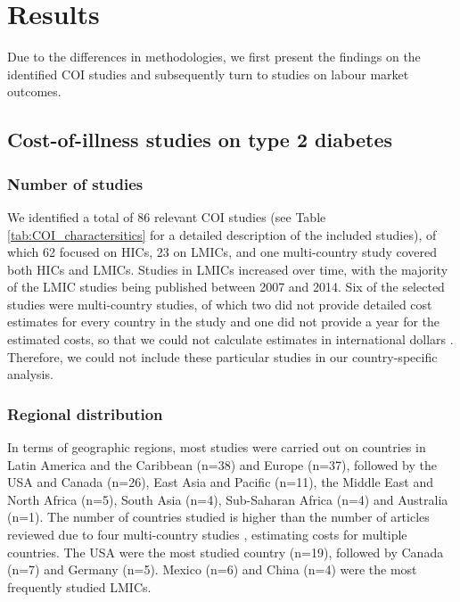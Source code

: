 \section{Results}
Due to the differences in methodologies, we first present the findings on the identified \ac{COI} studies and subsequently turn to studies on labour market outcomes.

\subsection{Cost-of-illness studies on type 2 diabetes}

\subsubsection*{Number of studies}
We identified a total of 86 relevant \ac{COI} studies (see Table \ref{tab:COI_charactersitics} for a detailed description of the included studies), of which 62 focused on \acp{HIC}, 23 on \acp{LMIC}, and one multi-country study covered both \acp{HIC} and \acp{LMIC}. Studies in \acp{LMIC} increased over time, with the majority of the \ac{LMIC} studies being published between 2007 and 2014. Six of the selected studies were multi-country studies, of which two \parencite{Kirigia2009,Smith-Spangler2012} did not provide detailed cost estimates for every country in the study and one did not provide a year for the estimated costs, so that we could not calculate estimates in international dollars \parencite{Boutayeb2014}. Therefore, we could not include these particular studies in our country-specific analysis.

\subsubsection*{Regional distribution}
In terms of geographic regions, most studies were carried out on countries in Latin America and the Caribbean (n=38) and Europe (n=37), followed by the USA and Canada (n=26), East Asia and Pacific (n=11), the Middle East and North Africa (n=5), South Asia (n=4), Sub-Saharan Africa (n=4) and Australia (n=1). The number of countries studied is higher than the number of articles reviewed due to four multi-country studies \parencite{Boutayeb2014,Barcelo2003,Jonsson2002b,Abdulkadri2009b}, estimating costs for multiple countries. The USA were the most studied country (n=19), followed by Canada (n=7) and Germany (n=5). Mexico (n=6) and China (n=4) were the most frequently studied \acp{LMIC}.

